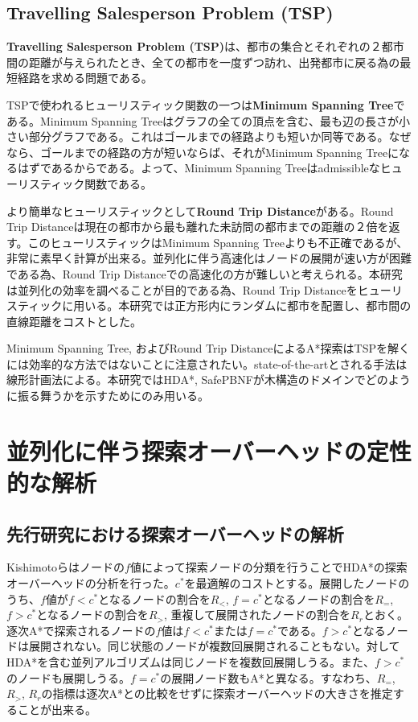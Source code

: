 \documentclass[uplatex]{jsarticle}
\begin{document}
\subsection{Travelling Salesperson Problem (TSP)}
\textbf{Travelling Salesperson Problem (TSP)}は、都市の集合とそれぞれの２都市間の距離が与えられたとき、全ての都市を一度ずつ訪れ、出発都市に戻る為の最短経路を求める問題である。

TSPで使われるヒューリスティック関数の一つは\textbf{Minimum Spanning Tree}である。Minimum Spanning Treeはグラフの全ての頂点を含む、最も辺の長さが小さい部分グラフである。これはゴールまでの経路よりも短いか同等である。なぜなら、ゴールまでの経路の方が短いならば、それがMinimum Spanning Treeになるはずであるからである。よって、Minimum Spanning Treeはadmissibleなヒューリスティック関数である。

より簡単なヒューリスティックとして\textbf{Round Trip Distance}がある。Round Trip Distanceは現在の都市から最も離れた未訪問の都市までの距離の２倍を返す。このヒューリスティックはMinimum Spanning Treeよりも不正確であるが、非常に素早く計算が出来る。並列化に伴う高速化はノードの展開が速い方が困難である為、Round Trip Distanceでの高速化の方が難しいと考えられる。本研究は並列化の効率を調べることが目的である為、Round Trip Distanceをヒューリスティックに用いる。本研究では正方形内にランダムに都市を配置し、都市間の直線距離をコストとした。

Minimum Spanning Tree, およびRound Trip DistanceによるA*探索はTSPを解くには効率的な方法ではないことに注意されたい。state-of-the-artとされる手法は線形計画法による\cite{applegate2006traveling}。本研究ではHDA*, SafePBNFが木構造のドメインでどのように振る舞うかを示すためにのみ用いる。

\newpage

\section{並列化に伴う探索オーバーヘッドの定性的な解析}
\label{sec:analysis1}

\subsection{先行研究における探索オーバーヘッドの解析}
Kishimotoらはノードの$f$値によって探索ノードの分類を行うことでHDA*の探索オーバーヘッドの分析を行った\cite{Kishimoto2013}。$c^*$を最適解のコストとする。展開したノードのうち、$f$値が$f < c^*$となるノードの割合を$R_{<}$, $f = c^*$となるノードの割合を$R_{=}$, $f > c^*$となるノードの割合を$R_{>}$, 重複して展開されたノードの割合を$R_{r}$とおく。逐次A*で探索されるノードの$f$値は$f < c^*$または$f = c^*$である。$f > c^*$となるノードは展開されない。同じ状態のノードが複数回展開されることもない。対してHDA*を含む並列アルゴリズムは同じノードを複数回展開しうる。また、$f > c^*$のノードも展開しうる。$f = c^*$の展開ノード数もA*と異なる。すなわち、$R_{=}$, $R_{>}$, $R_{r}$の指標は逐次A*との比較をせずに探索オーバーヘッドの大きさを推定することが出来る。
\end{document}

